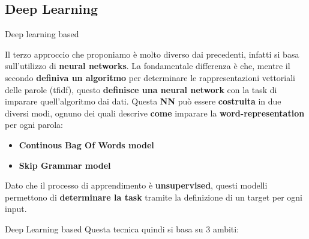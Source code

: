 \documentclass[british]{beamer}
\begin{document}
\subsection{Deep Learning}

\begin{frame}{Deep learning based}
	
	Il terzo approccio che proponiamo \`{e} molto diverso dai precedenti, infatti si basa sull'utilizzo di \textbf{neural networks}.
	La fondamentale differenza \`{e} che, mentre il secondo \textbf{definiva un algoritmo} per determinare le rappresentazioni vettoriali delle parole (tfidf), questo \textbf{definisce una neural network} con la task di imparare quell'algoritmo dai dati.
	Questa \textbf{NN} pu\`{o} essere \textbf{costruita} in due diversi modi, ognuno dei quali descrive \textbf{come} imparare la \textbf{word-representation} per ogni parola:
	\begin{itemize}
		\item \textbf{Continous Bag Of Words model}
		\item \textbf{Skip Grammar model}
	\end{itemize}
	Dato che il processo di apprendimento \`{e} \textbf{unsupervised}, questi modelli permettono di \textbf{determinare la task} tramite la definizione di un target per ogni input.
\end{frame}
	
\begin{frame}{Deep Learning based}
	Questa tecnica quindi si basa su 3 ambiti:
	\begin{figure}[!hf]
		\centering
	\end{figure}
\end{frame}
	
\end{document}
